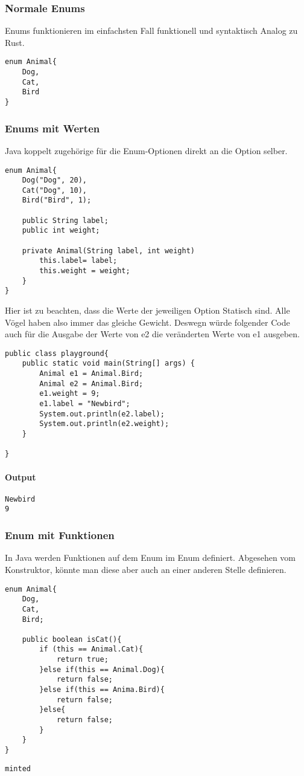 \documentclass[a4paper, 1ppt]{article}
\begin{document}
\subsubsection{Normale Enums}
Enums funktionieren im einfachsten Fall funktionell und syntaktisch Analog zu Rust.
\begin{verbatim}
enum Animal{
    Dog,
    Cat,
    Bird
}
\end{verbatim}
\newpage
\subsubsection{Enums mit Werten}
Java koppelt zugehörige für die Enum-Optionen direkt an die Option selber.
\begin{verbatim}
enum Animal{
    Dog("Dog", 20),
    Cat("Dog", 10),
    Bird("Bird", 1);

    public String label;
    public int weight;

    private Animal(String label, int weight)
        this.label= label;
        this.weight = weight;
    }
}
\end{verbatim}
Hier ist zu beachten, dass die Werte der jeweiligen Option Statisch sind.
Alle Vögel haben also immer das gleiche Gewicht.
Deswegn würde folgender Code auch für die Ausgabe der Werte von e2 die veränderten Werte von e1 ausgeben.
\begin{verbatim}
public class playground{
	public static void main(String[] args) {
		Animal e1 = Animal.Bird;
		Animal e2 = Animal.Bird;
		e1.weight = 9;		
		e1.label = "Newbird";
		System.out.println(e2.label);
		System.out.println(e2.weight);
	}
	
}
\end{verbatim}
\paragraph{Output}
\begin{verbatim}
Newbird
9
\end{verbatim}
\newpage
\subsubsection{Enum mit Funktionen}
In Java werden Funktionen auf dem Enum im Enum definiert. Abgesehen vom Konstruktor, könnte man diese aber auch an einer anderen Stelle definieren.
\begin{verbatim}
enum Animal{
    Dog,
    Cat,
    Bird;

    public boolean isCat(){
        if (this == Animal.Cat){
            return true;
        }else if(this == Animal.Dog){
            return false;
        }else if(this == Anima.Bird){
            return false;
		}else{
            return false;
		}
    }
}
\end{verbatim}
\begin{verbatim}
minted\end{verbatim}
\end{document}
